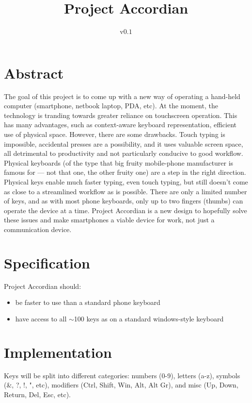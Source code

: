 \documentclass{article}
\title{Project Accordian}
\author{v$0.1$}
\begin{document}
\maketitle

\section{Abstract}
The goal of this project is to come up with a new way of operating a hand-held computer (smartphone, netbook laptop, PDA, etc). At the moment, the technology is tranding towards greater reliance on touchscreen operation. This has many advantages, such as context-aware keyboard representation, efficient use of physical space. However, there are some drawbacks. Touch typing is impossible, accidental presses are a possibility, and it uses valuable screen space, all detrimental to productivity and not particularly conducive to good workflow. Physical keyboards (of the type that big fruity mobile-phone manufacturer is famous for --- not that one, the other fruity one) are a step in the right direction. Physical keys enable much faster typing, even touch typing, but still doesn't come as close to a streamlined workflow as is possible. There are only a limited number of keys, and as with most phone keyboards, only up to two fingers (thumbs) can operate the device at a time. Project Accordian is a new design to hopefully solve these issues and make smartphones a viable device for work, not just a communication device.

\section{Specification}
Project Accordian should:
\begin{itemize}
\item be faster to use than a standard phone keyboard
\item have access to all $\sim$100 keys as on a standard windows-style keyboard
\end{itemize}

\section{Implementation}
Keys will be split into different categories: numbers (0-9), letters (a-z), symbols (\&, ?, !, ", etc), modifiers (Ctrl, Shift, Win, Alt, Alt Gr), and misc (Up, Down, Return, Del, Esc, etc).
\end{document}
